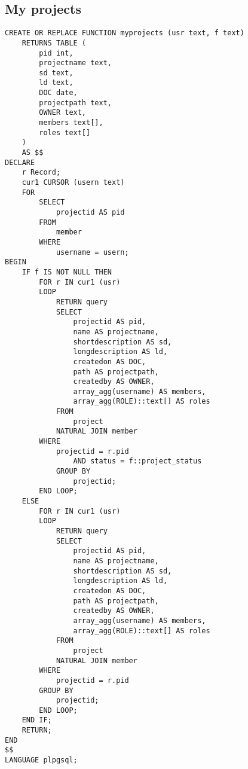\documentclass[conference,onecolumn]{IEEEtran}
\begin{document}
\subsection{My projects}
\begin{verbatim}
CREATE OR REPLACE FUNCTION myprojects (usr text, f text)
    RETURNS TABLE (
        pid int,
        projectname text,
        sd text,
        ld text,
        DOC date,
        projectpath text,
        OWNER text,
        members text[],
        roles text[]
    )
    AS $$
DECLARE
    r Record;
    cur1 CURSOR (usern text)
    FOR
        SELECT
            projectid AS pid
        FROM
            member
        WHERE
            username = usern;
BEGIN
    IF f IS NOT NULL THEN
        FOR r IN cur1 (usr)
        LOOP
            RETURN query
            SELECT
                projectid AS pid,
                name AS projectname,
                shortdescription AS sd,
                longdescription AS ld,
                createdon AS DOC,
                path AS projectpath,
                createdby AS OWNER,
                array_agg(username) AS members,
                array_agg(ROLE)::text[] AS roles
            FROM
                project
            NATURAL JOIN member
        WHERE
            projectid = r.pid
                AND status = f::project_status
            GROUP BY
                projectid;
        END LOOP;
    ELSE
        FOR r IN cur1 (usr)
        LOOP
            RETURN query
            SELECT
                projectid AS pid,
                name AS projectname,
                shortdescription AS sd,
                longdescription AS ld,
                createdon AS DOC,
                path AS projectpath,
                createdby AS OWNER,
                array_agg(username) AS members,
                array_agg(ROLE)::text[] AS roles
            FROM
                project
            NATURAL JOIN member
        WHERE
            projectid = r.pid
        GROUP BY
            projectid;
        END LOOP;
    END IF;
    RETURN;
END
$$
LANGUAGE plpgsql;
\end{verbatim}
\end{document}
